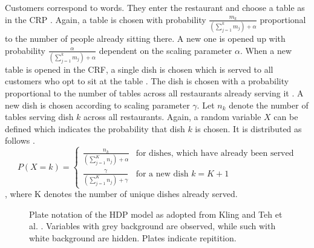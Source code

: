 Customers correspond to words. They enter the restaurant and choose a table as in the CRP \cite{DBLP:phd/dnb/Kling16}. Again, a table is chosen with probability $\frac{m_k}{(\sum_{j=1}^k m_j)+\alpha}$ proportional to the number of people already sitting there. A new one is opened up with probability $\frac{\alpha}{(\sum_{j=1}^k m_j)+\alpha}$ dependent on the scaling parameter $\alpha$. When a new table is opened in the CRF, a single dish is chosen which is served to all customers who opt to sit at the table \cite{Teh04hierarchicaldirichlet}. The dish is chosen with a probability proportional to the number of tables across all restaurants already serving it \cite{DBLP:phd/dnb/Kling16}. A new dish is chosen according to scaling parameter $\gamma$. Let $n_k$ denote the number of tables serving dish $k$ across all restaurants. Again, a random variable $X$ can be defined which indicates the probability that dish $k$ is chosen. It is distributed as follows \cite{xinggm}.
\begin{equation}
P(X=k) = \begin{cases} 
       \frac{n_k}{(\sum_{j=1}^K n_j)+\alpha}& \text{for dishes, which have already been served} \\
      \frac{\gamma}{(\sum_{j=1}^K n_j)+\gamma}& \text{for a new dish } k=K+1
   \end{cases}
\end{equation}, where K denotes the number of unique dishes already served.
\par

\begin{figure}[t]
\label{fig8}
	\centering
{}

	\caption{Plate notation of the HDP model as adopted from Kling \cite{DBLP:phd/dnb/Kling16} and Teh et al. \cite{Teh04hierarchicaldirichlet}. Variables with grey background are observed, while such with white background are hidden. Plates indicate repitition.}
\end{figure}

